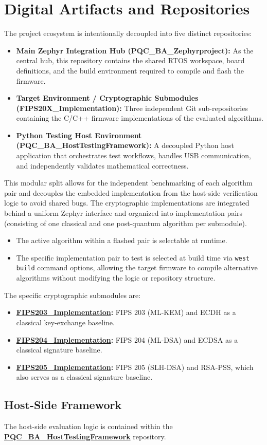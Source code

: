 \section{Digital Artifacts and Repositories}
The project ecosystem is intentionally decoupled into five distinct repositories:

\begin{itemize}
    \item \textbf{Main Zephyr Integration Hub (PQC\_BA\_Zephyrproject):} As the central hub, this repository contains the shared RTOS workspace, board definitions, and the build environment required to compile and flash the firmware.
    \item \textbf{Target Environment / Cryptographic Submodules (FIPS20X\_Implementation):} Three independent Git sub-repositories containing the C/C++ firmware implementations of the evaluated algorithms.
    \item \textbf{Python Testing Host Environment (PQC\_BA\_HostTestingFramework):} A decoupled Python host application that orchestrates test workflows, handles USB communication, and independently validates mathematical correctness.
\end{itemize}

This modular split allows for the independent benchmarking of each algorithm pair and decouples the embedded implementation from the host-side verification logic to avoid shared bugs. The cryptographic implementations are integrated behind a uniform Zephyr interface and organized into implementation pairs (consisting of one classical and one post-quantum algorithm per submodule). 

\begin{itemize}
    \item The active algorithm within a flashed pair is selectable at runtime.
    \item The specific implementation pair to test is selected at build time via \texttt{west build} command options, allowing the target firmware to compile alternative algorithms without modifying the logic or repository structure.
\end{itemize}

The specific cryptographic submodules are:
\begin{itemize}
    \item \textbf{\href{https://github.zhaw.ch/PQC-on-Microcontrollers/FIPS203_Implementation.git}{FIPS203\_Implementation}:} FIPS 203 (ML-KEM) and ECDH as a classical key-exchange baseline.
    \item \textbf{\href{https://github.zhaw.ch/PQC-on-Microcontrollers/FIPS204_Implementation.git}{FIPS204\_Implementation}:} FIPS 204 (ML-DSA) and ECDSA as a classical signature baseline.
    \item \textbf{\href{https://github.zhaw.ch/PQC-on-Microcontrollers/FIPS205_Implementation.git}{FIPS205\_Implementation}:} FIPS 205 (SLH-DSA) and RSA-PSS, which also serves as a classical signature baseline.
\end{itemize}

\subsection{Host-Side Framework}
The host-side evaluation logic is contained within the \textbf{\href{https://github.zhaw.ch/PQC-on-Microcontrollers/PQC_BA_HostTestingFramework.git}{PQC\_BA\_HostTestingFramework}} repository.
